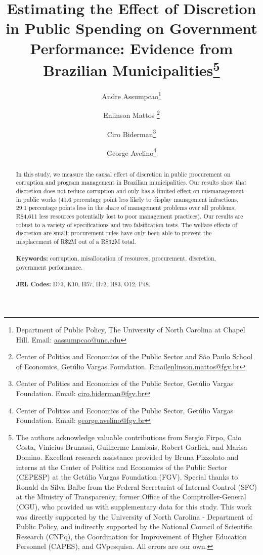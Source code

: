 \documentclass[11pt]{article}
\begin{document}
\begin{titlepage}
\title{Estimating the Effect of Discretion in Public Spending on Government Performance: Evidence from Brazilian Municipalities\thanks{The authors acknowledge valuable contributions from Sergio Firpo, Caio Costa, Vinicius Brunassi, Guilherme Lambais,
Robert Garlick, and Marisa Domino. Excellent research assistance provided by Bruna Pizzolato and interns at the Center of Politics and Economics of the Public Sector (CEPESP) at the Getúlio Vargas Foundation (FGV). Special thanks to Ronald da Silva Balbe from the Federal Secretariat of Internal Control (SFC) at the Ministry of Transparency, former Office of the Comptroller-General (CGU), who provided us with supplementary data for this study. This work was directly supported by the University of North Carolina - Department of Public Policy, and indirectly supported by the National Council of Scientific Research (CNPq), the Coordination for Improvement of Higher Education Personnel (CAPES), and GVpesquisa. All errors are our own.}}
\author{Andre Assumpcao\thanks{Department of Public Policy, The University of North Carolina at Chapel Hill. Email: \href{mailto:aassumpcao@unc.edu}{aassumpcao@unc.edu}} \and Enlinson Mattos \thanks{Center of Politics and Economics of the Public Sector and São Paulo School of Economics, Getúlio Vargas Foundation. Email\href{mailto:enlinson.mattos@fgv.br}{enlinson.mattos@fgv.br}} \and Ciro Biderman\thanks{Center of Politics and Economics of the Public Sector, Getúlio Vargas Foundation. Email: \href{mailto:ciro.biderman@fgv.br}{ciro.biderman@fgv.br}} \and George Avelino\thanks{Center of Politics and Economics of the Public Sector, Getúlio Vargas Foundation. Email: \href{mailto:george.avelino@fgv.br}{george.avelino@fgv.br}}}

\maketitle
\begin{abstract}
\noindent In this study, we measure the causal effect of discretion in public procurement on corruption and program management in Brazilian municipalities. Our results show that discretion does not reduce corruption and only has a limited effect on mismanagement in public works (41.6 percentage point less likely to display management infractions, 29.1 percentage points less in the  share of management problems over all problems, R\$4,611 less resources potentially lost to poor management practices). Our results are robust to a variety of specifications and two falsification tests. The welfare effects of discretion are small; procurement rules have only been able to prevent the misplacement of R\$2M out of a R\$32M total. \\
\vspace{0in}\\
\noindent\textbf{Keywords:} corruption, misallocation of resources, procurement, discretion, government performance.\\
\vspace{0in}\\
\noindent\textbf{JEL Codes:} D73, K10, H57, H72, H83, O12, P48.\\


\end{abstract}
\end{titlepage}
\end{document}
